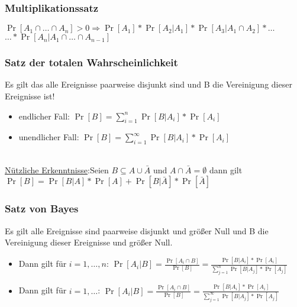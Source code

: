 \subsubsection{Multiplikationssatz}
$\Pr[A_1\cap\ldots\cap A_n]>0\Rightarrow\Pr[A_1]*\Pr[A_2|A_1]*\Pr[A_3|A_1\cap A_2]*\ldots$\\
$\dots*\Pr[A_n|A_1\cap\ldots\cap A_{n-1}]$

\subsubsection{Satz der totalen Wahrscheinlichkeit}
Es gilt das alle Ereignisse paarweise disjunkt sind und B die Vereinigung dieser Ereignisse ist!
\begin{itemize}
\item endlicher Fall: $\Pr[B]=\sum_{i=1}^n\Pr[B|A_i]*\Pr[A_i]$
\item unendlicher Fall: $\Pr[B]=\sum_{i=1}^\infty\Pr[B|A_i]*\Pr[A_i]$
\end{itemize}
\\
\underline{Nützliche Erkenntnisse}:Seien $B\subseteq A\cup\bar A$ und $A\cap\bar A =\emptyset$ dann gilt $\Pr[B]=\Pr[B|A]*\Pr[A]+\Pr[B|\bar A]*\Pr[\bar A]$

\subsubsection{Satz von Bayes}
Es gilt alle Ereignisse sind paarweise disjunkt und größer Null und B die Vereinigung dieser Ereignisse und größer Null.
\begin{itemize}
\item Dann gilt für $i=1,\ldots,n$: $\Pr[A_i|B]=\frac{\Pr[A_i\cap B]}{\Pr[B]}=\frac{\Pr[B|A_i]*\Pr[A_i]}{\sum^n_{j=1}\Pr[B|A_j]*\Pr[A_j]}$
\item Dann gilt für $i=1,\ldots$: $\Pr[A_i|B]=\frac{\Pr[A_i\cap B]}{\Pr[B]}=\frac{\Pr[B|A_i]*\Pr[A_i]}{\sum^\infty_{j=1}\Pr[B|A_j]*\Pr[A_j]}$
\end{itemize}
